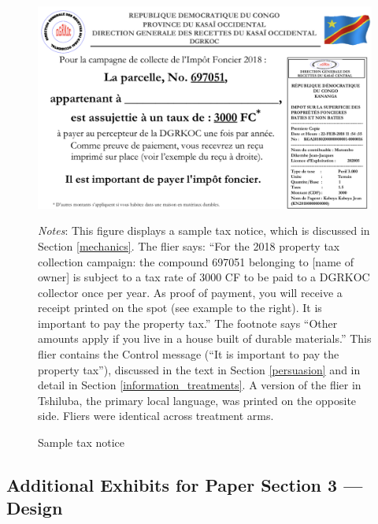 \documentclass[12pt,english]{article}
\renewcommand{\footnotesize}{\fontsize{9pt}{11pt}\selectfont}\usepackage[unicode=true,
\begin{document}
\begin{figure}[H]
\centering{}\caption{Sample tax notice \label{fig:flyerPG_L}}
\includegraphics[scale=0.5]{Documents/flier3000control.png} 
\usebox{\tablebox}\\[1ex]
\parbox{6in}{\footnotesize \textit{Notes}: This figure displays a sample tax notice, which is discussed in Section \ref{mechanics}. The flier says: ``For the 2018 property tax collection campaign: the compound 697051 belonging to [name of owner] is subject to a tax rate of 3000 CF to be paid to a DGRKOC collector once per year. As proof of payment, you will receive a receipt printed on the spot (see example to the right). It is important to pay the property tax.'' The footnote says ``Other amounts apply if you live in a house built of durable materials.'' This flier contains the Control message (``It is important to pay the property tax''), discussed in the text in Section \ref{persuasion} and in detail in Section \ref{information_treatments}. A version of the flier in Tshiluba, the primary local language, was printed on the opposite side. Fliers were identical across treatment arms.}
\end{figure}


\subsection{Additional Exhibits for Paper Section 3 --- Design}

\end{document}
